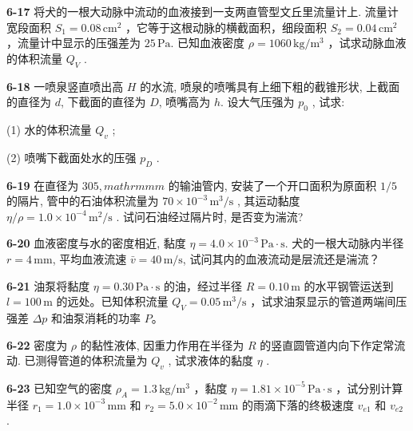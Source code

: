 \newpage

\textbf{6-17} 将犬的一根大动脉中流动的血液接到一支两直管型文丘里流量计上. 流量计宽段面积 $S_{1}=0.08\,\mathrm{cm}^{2}$ ，它等于这根动脉的横截面积，细段面积 $S_{2}=0.04\,\mathrm{cm}^{2}$ ，流量计中显示的压强差为 $25\,\mathrm{Pa}$. 已知血液密度 $\rho=1060\,\mathrm{kg/m^{3}}$ ，试求动脉血液的体积流量 $Q_{V}$ .

\newpage

\textbf{6-18} 一喷泉竖直喷出高 $H$ 的水流, 喷泉的喷嘴具有上细下粗的截锥形状, 上截面的直径为 $d$, 下截面的直径为 $D$, 喷嘴高为 $h$. 设大气压强为 $p_{0}$ , 试求:

(1) 水的体积流量 $Q_{v}$ ;

(2) 喷嘴下截面处水的压强 $p_{D}$ .

\newpage

\textbf{6-19} 在直径为 $305,mathrm{mm}$ 的输油管内, 安装了一个开口面积为原面积 $1/5$ 的隔片, 管中的石油体积流量为 $70 \times 10^{-3}\,\mathrm{m^{3}/s}$ , 其运动黏度 $\eta/\rho = 1.0 \times 10^{-4}\,\mathrm{m^{2}/s}$ . 试问石油经过隔片时, 是否变为湍流?

\newpage

\textbf{6-20} 血液密度与水的密度相近, 黏度 $\eta=4.0\times10^{-3}\,\mathrm{Pa\cdot s}$. 犬的一根大动脉内半径 $r=4\,\mathrm{mm}$, 平均血液流速 $\bar v=40\,\mathrm{m/s}$, 试问其内的血液流动是层流还是湍流？

\newpage

\textbf{6-21} 油泵将黏度 $\eta=0.30\,\mathrm{Pa\cdot s}$ 的油，经过半径 $R=0.10\,\mathrm m$ 的水平钢管运送到 $l=100\,\mathrm m$ 的远处。已知体积流量 $Q_{V}=0.05\,\mathrm{m^{3}/s}$ ，试求油泵显示的管道两端间压强差 $\Delta p$ 和油泵消耗的功率 $P$。

\newpage

\textbf{6-22} 密度为 $\rho$ 的黏性液体, 因重力作用在半径为 $R$ 的竖直圆管道内向下作定常流动. 已测得管道的体积流量为 $Q_{v}$ , 试求液体的黏度 $\eta$ .

\newpage

\textbf{6-23} 已知空气的密度 $\rho_{A}=1.3\,\mathrm{kg/m^{3}}$ ，黏度 $\eta=1.81\times10^{-5}\,\mathrm{Pa\cdot s}$ ，试分别计算半径 $r_{1}=1.0\times10^{-3}\,\mathrm{mm}$ 和 $r_{2}=5.0\times10^{-2}\,\mathrm{mm}$ 的雨滴下落的终极速度 $v_{e1}$ 和 $v_{e2}$ .

